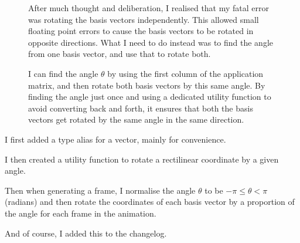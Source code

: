 \documentclass[../development.tex]{subfiles}
\begin{document}
\begin{figure}[H]
	\begin{minipage}{0.45\linewidth}
	\end{minipage}\hfill
	\begin{minipage}{0.5\linewidth}\setspacing
		After much thought and deliberation, I realised that my fatal error was rotating the basis vectors independently. This allowed small floating point errors to cause the basis vectors to be rotated in opposite directions. What I need to do instead was to find the angle from one basis vector, and use that to rotate both.

		I can find the angle $\theta$ by using the first column of the application matrix, and then rotate both basis vectors by this same angle. By finding the angle just once and using a dedicated  utility function to avoid converting back and forth, it ensures that both the basis vectors get rotated by the same angle in the same direction.
	\end{minipage}
	\vspace{-1em}
\end{figure}

I first added a type alias for a vector, mainly for convenience.


I then created a utility function to rotate a rectilinear coordinate by a given angle.


Then when generating a frame, I normalise the angle $\theta$ to be $-\pi \leq \theta < \pi$ (radians) and then rotate the coordinates of each basis vector by a proportion of the angle for each frame in the animation.


And of course, I added this to the changelog.
\end{document}
